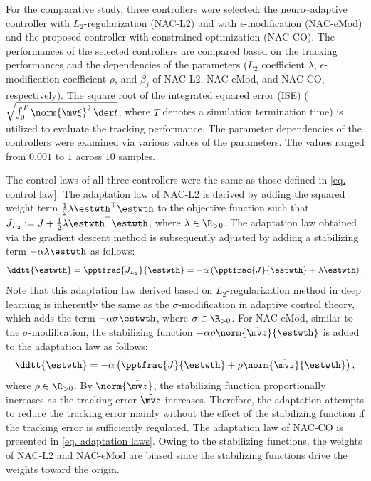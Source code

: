 \documentclass[letterpaper, 10 pt, conference]{ieeeconf}  %
\begin{document}
For the comparative study, three controllers were selected: the neuro–adaptive controller with $L_2$-regularization (NAC-L2) and with $\epsilon$-modification (NAC-eMod) and the proposed controller with constrained optimization (NAC-CO).
The performances of the selected controllers are compared based on the tracking performances and the dependencies of the parameters (\ie $L_2$ coefficient $\lambda$, $\epsilon$-modification coefficient $\rho$, and $\beta_j$ of NAC-L2, NAC-eMod, and NAC-CO, respectively).
The square root of the integrated squared error (ISE) (\ie $\sqrt{\int_0^T \norm{\mv \xi}^2\,\der t}$, where $T$ denotes a simulation termination time) is utilized to evaluate the tracking performance.
The parameter dependencies of the controllers were examined via various values of the parameters. 
The values ranged from $0.001$ to $1$ across $10$ samples.

The control laws of all three controllers were the same as those defined in \eqref{eq. control law}.
The adaptation law of NAC-L2 is derived by adding the squared weight term $\tfrac{1}{2}\lambda{\estwth}^\top {\estwth}$ to the objective function such that $J_{L_2}:= J+\tfrac{1}{2}\lambda{\estwth}^\top {\estwth}$, where $\lambda\in\R_{>0}$.
The adaptation law obtained via the gradient descent method is subsequently adjusted by adding a stabilizing term $-\alpha\lambda{\estwth}$ as follows:
\begin{equation} 
    \ddtt{{\estwth}} = 
    \pptfrac{J_{L_2}}{\estwth}
    =-\alpha
    \left(
        \pptfrac{J}{\estwth}
        +
        \lambda{\estwth}
    \right)
    .
    \label{eq. adap L2}
\end{equation}
Note that this adaptation law derived based on $L_2$-regularization method in deep learning is inherently the same as the $\sigma$-modification in adaptive control theory, which adds the term $-\alpha\sigma{\estwth}$, where $\sigma\in\R_{>0}$.
For NAC-eMod, similar to the $\sigma$-modification, the stabilizing function $-\alpha\rho\norm{\tilde{\mv z}}{\estwth}$ is added to the adaptation law as follows:
\begin{equation}
    \ddtt{{\estwth}} = -\alpha
    \left(
        \pptfrac{J}{\estwth}
        +
        \rho\norm{\tilde {\mv z}}{\estwth}
    \right)
    ,
    \label{eq. adap eMod}
\end{equation}
where $\rho\in\R_{>0}$.
By $\norm{\tilde {\mv z}}$, the stabilizing function proportionally increases as the tracking error $\tilde {\mv z}$ increases.
Therefore, the adaptation attempts to reduce the tracking error mainly without the effect of the stabilizing function if the tracking error is sufficiently regulated.
The adaptation law of NAC-CO is presented in \eqref{eq. adaptation laws}.
Owing to the stabilizing functions, the weights of NAC-L2 and NAC-eMod are biased since the stabilizing functions drive the weights toward the origin.
\end{document}
